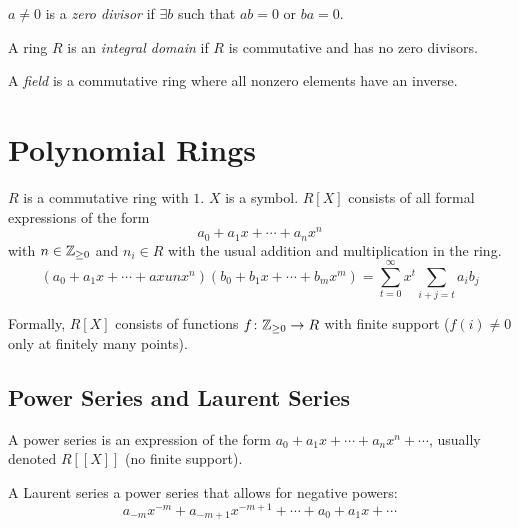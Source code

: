 \documentclass[a4paper,twoside,master.tex]{subfiles}
\begin{document}

\begin{definition}
    $ a \neq 0 $ is a \textit{zero divisor} if $ \exists b $ such that $ ab = 0 $ or $ b a = 0 $.
\end{definition}

\begin{definition}
    A ring $ R $ is an \textit{integral domain} if $ R $ is commutative and has no zero divisors.
\end{definition}

\begin{definition}
    A \textit{field} is a commutative ring where all nonzero elements have an inverse.
\end{definition}

\section{Polynomial Rings}
\label{sec:polynomial_rings}

$ R $ is a commutative ring with $ 1 $. $ X $ is a symbol. $ R[X] $ consists of all formal expressions of the form
\begin{equation}
    a_0 + a_1 x + \cdots + a_n x^n
\end{equation}
with $ n \in \mathbb{Z}_{\geq 0} $ and $ n_i \in R $ with the usual addition and multiplication in the ring.
\begin{equation}
    (a_0 + a_1 x + \cdots + a xu n x^n)(b_0 + b_1 x + \cdots + b_m x^m) = \sum_{t=0}^{\infty} x^t \sum_{i+j=t} a_i b_j
\end{equation}

Formally, $ R[X] $ consists of functions $ f\colon \mathbb{Z}_{\geq 0} \to R $ with finite support ($ f(i) \neq 0 $ only at finitely many points).

\subsection{Power Series and Laurent Series}
\label{sub:power_series_and_laurent_series}

A power series is an expression of the form $ a_0 + a_1 x + \cdots + a_n x^n + \cdots $, usually denoted $ R[ [X]] $ (no finite support).

A Laurent series a power series that allows for negative powers:
\begin{equation}
    a_{-m} x^{-m} + a_{-m+1} x^{-m+1} + \cdots + a_0 + a_1 x + \cdots
\end{equation}
\end{document}
